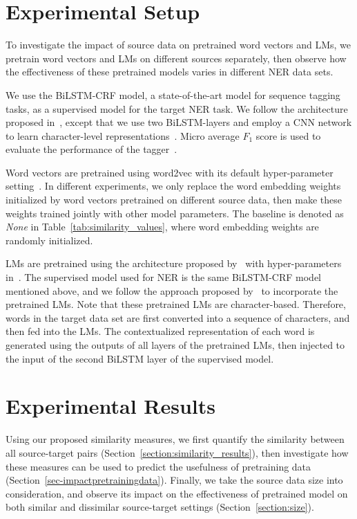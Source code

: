 \documentclass[11pt,a4paper]{article}
\begin{document}
\section{Experimental Setup}
\label{section:experimental-setup}
To investigate the impact of source data on pretrained word vectors and LMs, we pretrain word vectors and LMs on different sources separately, then observe how the effectiveness of these pretrained models varies in different NER data sets.

We use the BiLSTM-CRF model, a state-of-the-art model for sequence tagging tasks, as a supervised model for the target NER task. 
We follow the architecture proposed in~\citep{Lample:Ballesteros:NAACL:2016}, except that we use two BiLSTM-layers and employ a CNN network to learn character-level representations~\citep{Ma:Hovy:ACL:2016}. 
Micro average $F_1$ score is used to evaluate the performance of the tagger~\citep{Sang:Meulder:CONLL:2003}.

Word vectors are pretrained using word2vec with its default hyper-parameter setting~\citep{Mikolov:Chen:arXiv:2013}. 
In different experiments, we only replace the word embedding weights initialized by word vectors pretrained on different source data, then make these weights trained jointly with other model parameters. 
The baseline is denoted as {\em None} in Table~\ref{tab:similarity_values}, where word embedding weights are randomly initialized. 

LMs are pretrained using the architecture proposed by~\citet{Jozefowicz:Vinyals:arXiv:2016} with hyper-parameters in~\citep{Peters:Neumann:NAACL:2018}. 
The supervised model used for NER is the same BiLSTM-CRF model mentioned above, and we follow the approach proposed by~\citet{Peters:Neumann:NAACL:2018} to incorporate the pretrained LMs.
Note that these pretrained LMs are character-based. 
Therefore, words in the target data set are first converted into a sequence of characters, and then fed into the LMs. 
The contextualized representation of each word is generated using the outputs of all layers of the pretrained LMs, then injected to the input of the second BiLSTM layer of the supervised model.

\section{Experimental Results}
Using our proposed similarity measures, we first quantify the similarity between all source-target pairs (Section~\ref{section:similarity_results}), then investigate how these measures can be used to predict the usefulness of pretraining data (Section~\ref{sec-impactpretrainingdata}). Finally, we take the source data size into consideration, and observe its impact on the effectiveness of pretrained model on both similar and dissimilar source-target settings (Section~\ref{section:size}).
\end{document}
